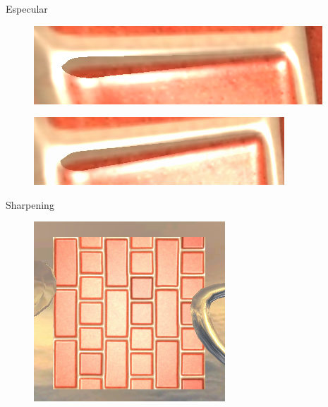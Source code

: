 \documentclass[table]{beamer}
\begin{document}
\begin{frame}[fragile]{Especular}
    \begin{figure}
        \includegraphics[width=\linewidth]{./figures/shadowtaaOFF.png}
    \end{figure}
    \begin{figure}
        \includegraphics[width=\linewidth]{./figures/shadowtaaON.png}
    \end{figure}
\end{frame}

\begin{frame}[fragile]{Sharpening}
    \begin{figure}
        \includegraphics[width=\linewidth]{./figures/sharpOFFsmall.png}
    \end{figure}
\end{frame}
\end{document}
